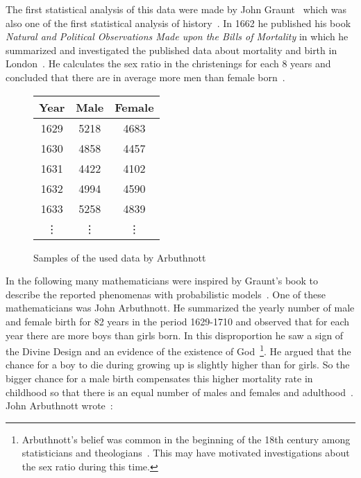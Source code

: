 The first statistical analysis of this data were made by John Graunt~\cite[p. 83]{hald1} which was also one of the first statistical analysis of history~\cite[p. 81]{hald1}. In 1662 he published his book \emph{Natural and Political Observations Made upon the Bills of Mortality} in which he summarized and investigated the published data about mortality and birth in London~\cite[pp. 81-105]{hald1}. He calculates the sex ratio in the christenings for each $8$ years and concluded that there are in average more men than female born~\cite[pp. 92-93]{hald1}.

\begin{figure}
  \begin{center}
    \begin{tabular}{c|c|c}
      Year & Male & Female \\
      \hline
      1629 & 5218 & 4683 \\
      1630 & 4858 & 4457 \\
      1631 & 4422 & 4102 \\
      1632 & 4994 & 4590 \\
      1633 & 5258 & 4839 \\
      \vdots & \vdots & \vdots
    \end{tabular}

    \caption{Samples of the used data by Arbuthnott~\cite[p. 276]{hald1}}
  \end{center}
\end{figure}

In the following many mathematicians were inspired by Graunt's book to describe the reported phenomenas with probabilistic models~\cite[p. 275]{hald1}. One of these mathematicians was John Arbuthnott. He summarized the yearly number of male and female birth for 82 years in the period 1629-1710 and observed that for each year there are more boys than girls born. In this disproportion he saw a sign of the Divine Design and an evidence of the existence of God~\cite[p. 277]{hald1}\footnote{Arbuthnott's belief was common in the beginning of the 18th century among statisticians and theologians~\cite[p.~285]{hald1}. This may have motivated investigations about the sex ratio during this time.}. He argued that the chance for a boy to die during growing up is slightly higher than for girls. So the bigger chance for a male birth compensates this higher mortality rate in childhood so that there is an equal number of males and females and adulthood~\cite[p. 277]{hald1}. John Arbuthnott wrote~\cite[p. 275]{hald1}:

